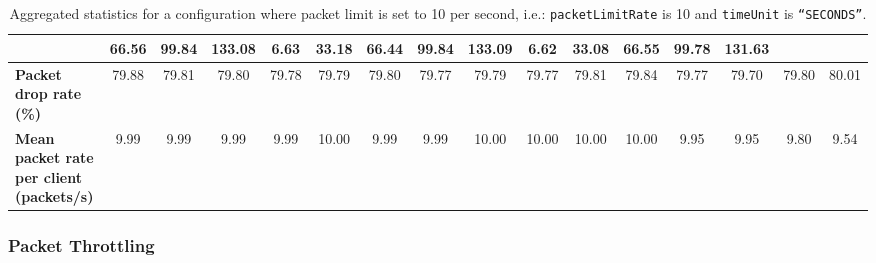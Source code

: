 \begin{table}[!h]
{\begin{tabular}{|l|ccccc|ccccc|ccccc|}
            & \multicolumn{1}{c|}{66.56}
            & \multicolumn{1}{c|}{99.84}
            & \multicolumn{1}{c|}{133.08}
            & \multicolumn{1}{c|}{6.63}
            & \multicolumn{1}{c|}{33.18}
            & \multicolumn{1}{c|}{66.44}
            & \multicolumn{1}{c|}{99.84}
            & \multicolumn{1}{c|}{133.09}
            & \multicolumn{1}{c|}{6.62}
            & \multicolumn{1}{c|}{33.08}
            & \multicolumn{1}{c|}{66.55}
            & \multicolumn{1}{c|}{99.78}
            & \multicolumn{1}{c|}{131.63}
            \\ \hline
            \textbf{Packet drop rate (\%)} & \multicolumn{1}{c|}{79.88} & \multicolumn{1}{c|}{79.81}
            & \multicolumn{1}{c|}{79.80}
            & \multicolumn{1}{c|}{79.78}
            & \multicolumn{1}{c|}{79.79}
            & \multicolumn{1}{c|}{79.80}
            & \multicolumn{1}{c|}{79.77}
            & \multicolumn{1}{c|}{79.79}
            & \multicolumn{1}{c|}{79.77}
            & \multicolumn{1}{c|}{79.81}
            & \multicolumn{1}{c|}{79.84}
            & \multicolumn{1}{c|}{79.77}
            & \multicolumn{1}{c|}{79.70}
            & \multicolumn{1}{c|}{79.80}
            & \multicolumn{1}{c|}{80.01}
            \\ \hline
            \textbf{Mean packet rate per client (packets/s)} & \multicolumn{1}{c|}{9.99} & \multicolumn{1}{c|}{9.99}
            & \multicolumn{1}{c|}{9.99}
            & \multicolumn{1}{c|}{9.99}
            & \multicolumn{1}{c|}{10.00}
            & \multicolumn{1}{c|}{9.99}
            & \multicolumn{1}{c|}{9.99}
            & \multicolumn{1}{c|}{10.00}
            & \multicolumn{1}{c|}{10.00}
            & \multicolumn{1}{c|}{10.00}
            & \multicolumn{1}{c|}{10.00}
            & \multicolumn{1}{c|}{9.95}
            & \multicolumn{1}{c|}{9.95}
            & \multicolumn{1}{c|}{9.80}
            & \multicolumn{1}{c|}{9.54}
            \\ \hline
        \end{tabular}
    }
    \caption{Aggregated statistics for a configuration where packet limit is set to 10 per second, i.e.:
    \texttt{packetLimitRate} is 10 and \texttt{timeUnit} is \texttt{``SECONDS''}.}
    \label{table:analysis_results_limit}
\end{table}

\subsubsection{Packet Throttling}\label{subsubsection:throttle_analysis}

